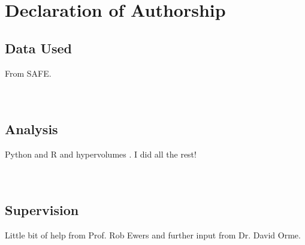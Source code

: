 \clearpage

\section*{Declaration of Authorship}

\subsection*{Data Used}

From SAFE. \\ \\ \\

\subsection*{Analysis}

Python and R \citep{RCoreTeam2017} and hypervolumes \citep{Blonder2017a}. I did all the rest! \\ \\ \\

\subsection*{Supervision}

Little bit of help from Prof. Rob Ewers and further input from Dr. David Orme. \\ \\ \\